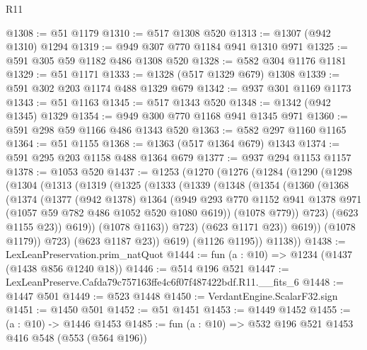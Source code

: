 \begin{lexlean}{R11}
\begin{coremodule}
@1308 := @51 @1179
@1310 := @517 @1308 @520
@1313 := @1307 (@942 @1310) @1294
@1319 := @949 @307 @770 @1184 @941 @1310 @971
@1325 := @591 @305 @59 @1182 @486 @1308 @520
@1328 := @582 @304 @1176 @1181
@1329 := @51 @1171
@1333 := @1328 (@517 @1329 @679) @1308
@1339 := @591 @302 @203 @1174 @488 @1329 @679
@1342 := @937 @301 @1169 @1173
@1343 := @51 @1163
@1345 := @517 @1343 @520
@1348 := @1342 (@942 @1345) @1329
@1354 := @949 @300 @770 @1168 @941 @1345 @971
@1360 := @591 @298 @59 @1166 @486 @1343 @520
@1363 := @582 @297 @1160 @1165
@1364 := @51 @1155
@1368 := @1363 (@517 @1364 @679) @1343
@1374 := @591 @295 @203 @1158 @488 @1364 @679
@1377 := @937 @294 @1153 @1157
@1378 := @1053 @520
@1437 := @1253
    (@1270
      (@1276
        (@1284
          (@1290
            (@1298
              (@1304
                (@1313
                  (@1319
                    (@1325
                      (@1333
                        (@1339
                          (@1348
                            (@1354
                              (@1360
                                (@1368
                                  (@1374
                                    (@1377
                                      (@942 @1378)
                                      @1364
                                      (@949
                                        @293
                                        @770
                                        @1152
                                        @941
                                        @1378
                                        @971
                                        (@1057 @59 @782 @486 @1052 @520 @1080 @619))
                                      (@1078 @779))
                                    @723)
                                  (@623 @1155 @23))
                                @619))
                            (@1078 @1163))
                          @723)
                        (@623 @1171 @23))
                      @619))
                  (@1078 @1179))
                @723)
              (@623 @1187 @23))
            @619)
          (@1126 @1195))
        @1138))
@1438 := LexLeanPreservation.prim_natQuot
@1444 := fun (a : @10) => @1234 (@1437 (@1438 @856 @1240 @18))
@1446 := @514 @196 @521
@1447 := LexLeanPreserve.Cafda79c757163ffe4c6f07f487422bdf.R11.__fits_6
@1448 := @1447 @501
@1449 := @523 @1448
@1450 := VerdantEngine.ScalarF32.sign
@1451 := @1450 @501
@1452 := @51 @1451
@1453 := @1449 @1452
@1455 := (a : @10) -> @1446 @1453
@1485 := fun (a : @10) =>
  @532
    @196
    @521
    @1453
    @416
    @548
    (@553 (@564 @196))

\end{coremodule}
\end{lexlean}
